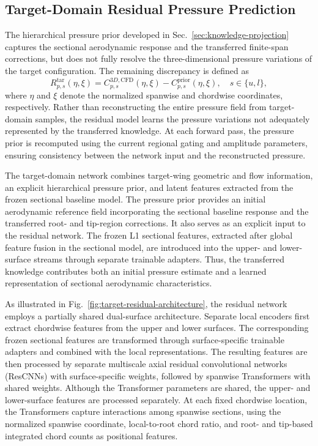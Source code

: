 

\subsection{Target-Domain Residual Pressure Prediction}
\label{sec:target-residual}

The hierarchical pressure prior developed in Sec.~\ref{sec:knowledge-projection} captures the sectional aerodynamic response and the transferred finite-span corrections, but does not fully resolve the three-dimensional pressure variations of the target configuration. The remaining discrepancy is defined as
\begin{equation}
R_{p,s}^{\mathrm{tar}}(\eta,\xi)
=
C_{p,s}^{3D,\mathrm{CFD}}(\eta,\xi)
-
C_{p,s}^{\mathrm{prior}}(\eta,\xi),
\quad s\in\{u,l\},
\label{eq:target-residual-definition}
\end{equation}
where $\eta$ and $\xi$ denote the normalized spanwise and chordwise coordinates, respectively. Rather than reconstructing the entire pressure field from target-domain samples, the residual model learns the pressure variations not adequately represented by the transferred knowledge. At each forward pass, the pressure prior is recomputed using the current regional gating and amplitude parameters, ensuring consistency between the network input and the reconstructed pressure.

The target-domain network combines target-wing geometric and flow information, an explicit hierarchical pressure prior, and latent features extracted from the frozen sectional baseline model. The pressure prior provides an initial aerodynamic reference field incorporating the sectional baseline response and the transferred root- and tip-region corrections. It also serves as an explicit input to the residual network. The frozen L1 sectional features, extracted after global feature fusion in the sectional model, are introduced into the upper- and lower-surface streams through separate trainable adapters. Thus, the transferred knowledge contributes both an initial pressure estimate and a learned representation of sectional aerodynamic characteristics.

As illustrated in Fig.~\ref{fig:target-residual-architecture}, the residual network employs a partially shared dual-surface architecture. Separate local encoders first extract chordwise features from the upper and lower surfaces. The corresponding frozen sectional features are transformed through surface-specific trainable adapters and combined with the local representations. The resulting features are then processed by separate multiscale axial residual convolutional networks (ResCNNs) with surface-specific weights, followed by spanwise Transformers with shared weights. Although the Transformer parameters are shared, the upper- and lower-surface features are processed separately. At each fixed chordwise location, the Transformers capture interactions among spanwise sections, using the normalized spanwise coordinate, local-to-root chord ratio, and root- and tip-based integrated chord counts as positional features.


